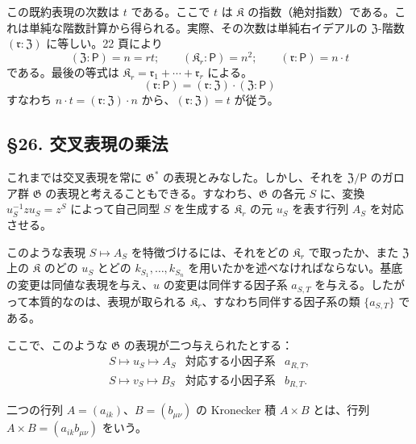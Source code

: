 この既約表現の次数は \(t\) である。ここで \(t\) は \(\mathfrak K\) の指数（絶対指数）である。これは単純な階数計算から得られる。実際、その次数は単純右イデアルの \(\mathfrak Z\)-階数 \((\mathfrak r:\mathfrak Z)\) に等しい。22 頁により
\[
(\mathfrak Z:\mathsf P)=n=rt;\qquad
(\mathfrak K_r:\mathsf P)=n^2;\qquad
(\mathfrak r:\mathsf P)=n\cdot t
\]
である。最後の等式は \(\mathfrak K_r=\mathfrak r_1+\cdots+\mathfrak r_r\) による。
\[
(\mathfrak r:\mathsf P)
=(\mathfrak r:\mathfrak Z)\cdot(\mathfrak Z:\mathsf P)
\]
すなわち \(n\cdot t=(\mathfrak r:\mathfrak Z)\cdot n\) から、\((\mathfrak r:\mathfrak Z)=t\) が従う。

\subsection*{\S 26. 交叉表現の乗法}\label{multiplikation-der-verschraenkten-darstellungen}

これまでは交叉表現を常に \(\mathfrak G^*\) の表現とみなした。しかし、それを \(\mathfrak Z/\mathsf P\) のガロア群 \(\mathfrak G\) の表現と考えることもできる。すなわち、\(\mathfrak G\) の各元 \(S\) に、変換 \(u_S^{-1}zu_S=z^S\) によって自己同型 \(S\) を生成する \(\mathfrak K_r\) の元 \(u_S\) を表す行列 \(A_S\) を対応させる。

このような表現 \(S\mapsto A_S\) を特徴づけるには、それをどの \(\mathfrak K_r\) で取ったか、また \(\mathfrak Z\) 上の \(\mathfrak K\) のどの \(u_S\) とどの \(k_{S_1},\ldots,k_{S_n}\) を用いたかを述べなければならない。基底の変更は同値な表現を与え、\(u\) の変更は同伴する因子系 \(a_{S,T}\) を与える。したがって本質的なのは、表現が取られる \(\mathfrak K_r\)、すなわち同伴する因子系の類 \(\{a_{S,T}\}\) である。

ここで、このような \(\mathfrak G\) の表現が二つ与えられたとする：
\[
\begin{array}{lll}
S\mapsto u_S\mapsto A_S
&\text{対応する小因子系}&a_{R,T},\\
S\mapsto v_S\mapsto B_S
&\text{対応する小因子系}&b_{R,T}.
\end{array}
\]

二つの行列 \(A=(a_{ik})\)、\(B=(b_{\mu\nu})\) の Kronecker 積 \(A\times B\) とは、行列 \(A\times B=(a_{ik}b_{\mu\nu})\) をいう。

